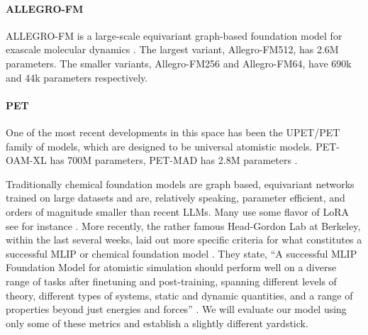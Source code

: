 \documentclass[10pt]{article}
\begin{document}
\paragraph{ALLEGRO-FM} ALLEGRO-FM is a large-scale equivariant graph-based foundation model for exascale molecular dynamics \citep{ALLEGRO-FM}. The largest variant, Allegro-FM512, has 2.6M parameters. The smaller variants, Allegro-FM256 and Allegro-FM64, have 690k and 44k parameters respectively.

\paragraph{PET} One of the most recent developments in this space has been the UPET/PET family of models, which are designed to be universal atomistic models. PET-OAM-XL has 700M parameters, PET-MAD has 2.8M parameters \citep{PET}.

Traditionally chemical foundation models are graph based, equivariant networks trained on large datasets and are, relatively speaking, parameter efficient, and orders of magnitude smaller than recent LLMs. Many use some flavor of LoRA see for instance \citet{PET}. More recently, the rather famous Head-Gordon Lab at Berkeley, within the last several weeks, laid out more specific criteria for what constitutes a successful MLIP or chemical foundation model \citep{yuan2026foundation}. They state, ``A successful MLIP Foundation Model for atomistic simulation should perform well on a diverse range of tasks after finetuning and post-training, spanning different levels of theory, different types of systems, static and dynamic quantities, and a range of properties beyond just energies and forces'' \citep{yuan2026foundation}. We will evaluate our model using only some of these metrics and establish a slightly different yardstick.
\end{document}
